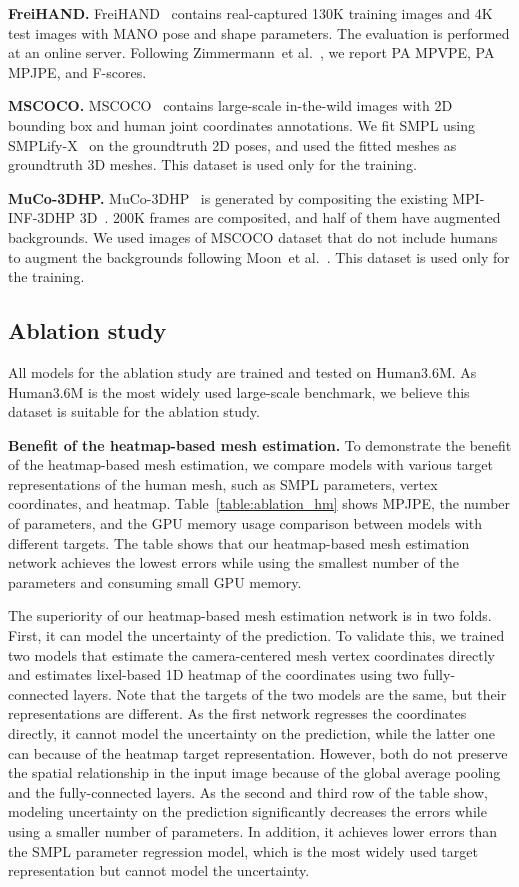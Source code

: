\documentclass[runningheads]{llncs}
\begin{document}
\noindent \textbf{FreiHAND.}
FreiHAND~\cite{Freihand2019} contains real-captured 130K training images and 4K test images with MANO pose and shape parameters.
The evaluation is performed at an online server. 
Following Zimmermann~et al.~\cite{Freihand2019}, we report PA MPVPE, PA MPJPE, and F-scores.


\noindent \textbf{MSCOCO.}
MSCOCO~\cite{lin2014microsoft} contains large-scale in-the-wild images with 2D bounding box and human joint coordinates annotations.
We fit SMPL using SMPLify-X~\cite{pavlakos2019expressive} on the groundtruth 2D poses, and used the fitted meshes as groundtruth 3D meshes.
This dataset is used only for the training.


\noindent \textbf{MuCo-3DHP.}
MuCo-3DHP~\cite{mehta2018single} is generated by compositing the existing MPI-INF-3DHP 3D~\cite{mehta2017monocular}.
200K frames are composited, and half of them have augmented backgrounds.
We used images of MSCOCO dataset that do not include humans to augment the backgrounds following Moon~et al.~\cite{moon2019camera}.
This dataset is used only for the training.


\subsection{Ablation study}
All models for the ablation study are trained and tested on Human3.6M. 
As Human3.6M is the most widely used large-scale benchmark, we believe this dataset is suitable for the ablation study. 

\noindent \textbf{Benefit of the heatmap-based mesh estimation.}
To demonstrate the benefit of the heatmap-based mesh estimation, we compare models with various target representations of the human mesh, such as SMPL parameters, vertex coordinates, and heatmap. 
Table~\ref{table:ablation_hm} shows MPJPE, the number of parameters, and the GPU memory usage comparison between models with different targets.
The table shows that our heatmap-based mesh estimation network achieves the lowest errors while using the smallest number of the parameters and consuming small GPU memory.


The superiority of our heatmap-based mesh estimation network is in two folds.
First, it can model the uncertainty of the prediction.
To validate this, we trained two models that estimate the camera-centered mesh vertex coordinates directly and estimates lixel-based 1D heatmap of the coordinates using two fully-connected layers.
Note that the targets of the two models are the same, but their representations are different.
As the first network regresses the coordinates directly, it cannot model the uncertainty on the prediction, while the latter one can because of the heatmap target representation.
However, both do not preserve the spatial relationship in the input image because of the global average pooling and the fully-connected layers.
As the second and third row of the table show, modeling uncertainty on the prediction significantly decreases the errors while using a smaller number of parameters.
In addition, it achieves lower errors than the SMPL parameter regression model, which is the most widely used target representation but cannot model the uncertainty.
\end{document}
